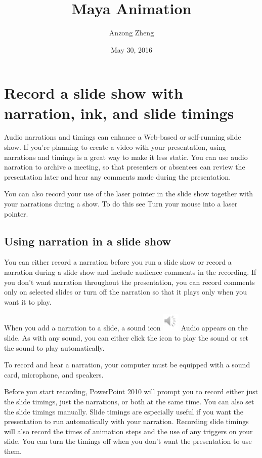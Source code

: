 \documentclass[10pt,a4paper]{article}
\begin{document}
\author{Anzong Zheng}
\title{Maya Animation}
\date{May 30, 2016}
\maketitle

\tableofcontents

\newpage

\section{Record a slide show with narration, ink, and slide timings}
Audio narrations and timings can enhance a Web-based or self-running slide show. If you’re planning to create a video with your presentation, using narrations and timings is a great way to make it less static. You can use audio narration to archive a meeting, so that presenters or absentees can review the presentation later and hear any comments made during the presentation.

You can also record your use of the laser pointer in the slide show together with your narrations during a show. To do this see Turn your mouse into a laser pointer.

\subsection{Using narration in a slide show}
You can either record a narration before you run a slide show or record a narration during a slide show and include audience comments in the recording. If you don't want narration throughout the presentation, you can record comments only on selected slides or turn off the narration so that it plays only when you want it to play.

When you add a narration to a slide, a sound icon \includegraphics{ppt_sound} Audio appears on the slide. As with any sound, you can either click the icon to play the sound or set the sound to play automatically.

To record and hear a narration, your computer must be equipped with a sound card, microphone, and speakers.

Before you start recording, PowerPoint 2010 will prompt you to record either just the slide timings, just the narrations, or both at the same time. You can also set the slide timings manually. Slide timings are especially useful if you want the presentation to run automatically with your narration. Recording slide timings will also record the times of animation steps and the use of any triggers on your slide. You can turn the timings off when you don't want the presentation to use them.
\end{document}
